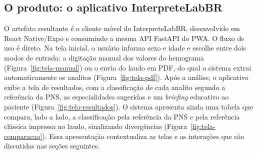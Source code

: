 
\subsection{O produto: o aplicativo InterpreteLabBR}
\label{sub:produto}

O artefato resultante é o cliente móvel do InterpreteLabBR, desenvolvido em React
Native/Expo e consumindo a mesma API FastAPI do PWA. O fluxo de uso é direto. Na
tela inicial, o usuário informa sexo e idade e escolhe entre dois modos de entrada:
a digitação manual dos valores do hemograma (Figura~\ref{fig:tela-manual}) ou o
envio do laudo em PDF, do qual o sistema extrai automaticamente os analitos
(Figura~\ref{fig:tela-pdf}). Após a análise, o aplicativo exibe a tela de
resultados, com a classificação de cada analito segundo a referência da PNS, as
especialidades sugeridas e um \emph{briefing} educativo ao paciente
(Figura~\ref{fig:tela-resultados}). O sistema apresenta ainda uma tabela que
compara, lado a lado, a classificação pela referência da PNS e pela referência
clássica impressa no laudo, sinalizando divergências
(Figura~\ref{fig:tela-comparacao}). Essa apresentação contextualiza as telas e as
interações que são discutidas nas seções seguintes.

